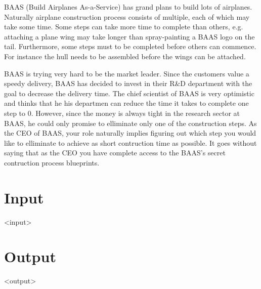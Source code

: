 
BAAS (Build Airplanes As-a-Service) has grand plans to build lots of airplanes.
Naturally airplane construction process consists of multiple, each of which may take some time.
Some steps can take more time to complete than others, e.g. attaching a plane wing may take longer than spray-painting a BAAS logo on the tail.
Furthermore, some steps must to be completed before others can commence. For instance the hull needs to be assembled before the wings can be attached.

BAAS is trying very hard to be the market leader.
Since the customers value a speedy delivery, BAAS has decided to invest in their R\&D department with the goal to decrease the delivery time.
The chief scientist of BAAS is very optimistic and thinks that he his departmen can reduce the time it takes to complete one step to 0.
However, since the money is always tight in the research sector at BAAS, he could only promise to elliminate only one of the construction steps.
As the CEO of BAAS, your role naturally implies figuring out which step you would like to elliminate to achieve as short contruction time as possible.
It goes without saying that as the CEO you have complete access to the BAAS's secret contruction process blueprints.

\section*{Input}

<input>

\section*{Output}

<output>
